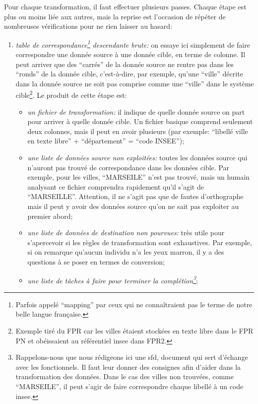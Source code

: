 \documentclass{book}
\begin{document}
Pour chaque transformation, il faut effectuer plusieurs passes. Chaque étape est plus ou moins liée aux autres, mais la reprise est l'occasion de répéter de nombreuses vérifications pour ne rien laisser au hasard:
\begin{enumerate}
 \item \textit{table de correspondance\footnote{Parfois appelé ``mapping'' par ceux qui ne connaîtraient pas le terme de notre belle langue française.} descendante brute:} on essaye ici simplement de faire correspondre une donnée source à une donnée cible, en terme de colonne. Il peut arriver que des ``carrés'' de la donnée source ne rentre pas dans les ``ronds'' de la donnée cible, c'est-à-dire, par exemple, qu'une ``ville'' décrite dans la donnée source ne soit pas comprise comme une ``ville'' dans le système cible\footnote{Exemple tiré du FPR car les villes étaient stockées en texte libre dans le FPR PN et obéissaient au référentiel \gls{insee} dans FPR2.}. Le produit de cette étape est:
 \begin{itemize}
  \item \textit{un fichier de transformation:} il indique de quelle donnée source on part pour arriver à quelle donnée cible. Un fichier basique comprend seulement deux colonnes, mais il peut en avoir plusieurs (par exemple: ``libellé ville en texte libre'' + ``département'' = ``code INSEE'');
  \item \textit{une liste de données source non exploitées:} toutes les données source qui n'auront pas trouvé de correspondance dans les données cible. Par exemple, pour les villes, ``MARSEILE'' n'est pas trouvé, mais un humain analysant ce fichier comprendra rapidement qu'il s'agit de ``MARSEILLE''. Attention, il ne s'agit pas que de fautes d'orthographe mais il peut y avoir des données source qu'on ne sait pas exploiter au premier abord;
  \item \textit{une liste de données de destination non pourvues:} très utile pour s'apercevoir si les règles de transformation sont exhaustives. Par exemple, si on remarque qu'aucun individu n'a les yeux marron, il y a des questions à se poser en termes de conversion;
  \item \textit{une liste de tâches à faire pour terminer la complétion\footnote{Rappelons-nous que nous rédigeons ici une \gls{sfd}, document qui sert d'échange avec les \gls{fonctionnels}. Il faut leur donner des consignes afin d'aider dans la transformation des données. Dans le cas des villes non trouvées, comme ``MARSEILE'', il peut s'agir de faire correspondre chaque libellé à un code \gls{insee}.}};

\end{itemize}
\end{enumerate}
\end{document}
